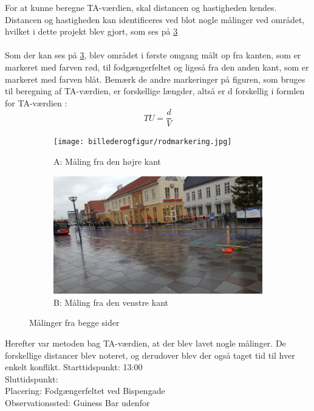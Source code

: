 For at kunne beregne TA-værdien, skal distancen og hastigheden kendes. Distancen og hastigheden kan identificeres ved blot nogle målinger ved området, hvilket i dette projekt blev gjort, som ses på \cref{fig:maalingerfrabegge}
\\\\
Som der kan ses på \cref{fig:maalingerfrabegge}, blev området i første omgang målt op fra kanten, som er markeret med farven rød, til fodgængerfeltet og ligeså fra den anden kant, som er markeret med farven blåt. Bemærk de andre markeringer på figuren, som bruges til beregning af TA-værdien, er forskellige længder, altså er d forskellig i formlen for TA-værdien : $$ TU=\frac{d}{V} $$
\begin{figure}
\centering
\begin{subfigure}{1\textwidth}
  \centering
  \texttt{[image: billederogfigur/rodmarkering.jpg]}
  \caption{A: Måling fra den højre kant}
  \label{fig:obsomrrod}
\end{subfigure}
\begin{subfigure}{1\textwidth}
  \centering
  \includegraphics[width=1\linewidth]{billederogfigur/blaamarkering.jpg}
  \caption{B: Måling fra den venstre kant}
  \label{fig:obsomrblaa}
\end{subfigure}
\caption{Målinger fra begge sider}
\label{fig:maalingerfrabegge}
\end{figure}
Herefter var metoden bag TA-værdien, at der blev lavet nogle målinger. De forskellige distancer blev noteret, og derudover blev der også taget tid til hver enkelt konflikt.
Starttidspunkt: 13:00
\\
Sluttidspunkt:
\\
Placering: Fodgængerfeltet ved Bispengade
\\
Observationssted: Guiness Bar udenfor
\\
